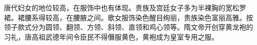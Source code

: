 唐代妇女的地位较高，在服饰中也有体现。贵族及宫廷女子多为半裸胸的宽松罗裙。裙腰系得较高，在腰腋之间。歌女服饰染色醒目绚丽，贵族染色富丽高雅。按领子款式分为圆领、翻领、方领、斜领、直领和鸡心领等。隋文帝开创穿黄龙袍的习礼，唐高祖武德年间令臣民不得僭服黄色，黄袍成为皇室专用之服。
























% 

